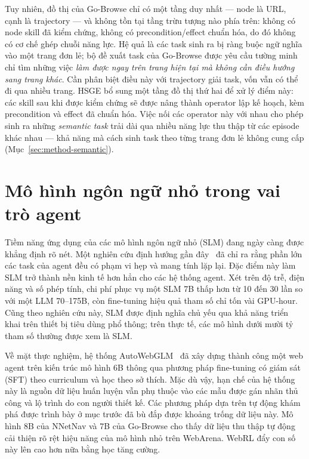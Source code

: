Tuy nhiên, đồ thị của Go-Browse chỉ có một tầng duy nhất --- node là URL, cạnh là
trajectory --- và không tồn tại tầng trừu tượng nào phía trên: không có node skill đã
kiểm chứng, không có precondition/effect chuẩn hóa, do đó không có cơ chế ghép chuỗi
năng lực. Hệ quả là các task sinh ra bị ràng buộc ngữ nghĩa vào một trang đơn lẻ;
bộ đề xuất task của Go-Browse được yêu cầu tường minh chỉ tìm những
việc \emph{làm được ngay trên trang hiện tại mà không cần điều hướng sang trang
khác}. Cần phân biệt điều này với trajectory giải task, vốn vẫn có thể đi qua nhiều
trang. HSGE bổ sung một tầng đồ thị thứ hai để xử lý điểm này: các skill sau khi được kiểm chứng sẽ được nâng thành operator
lập kế hoạch, kèm precondition và effect
đã chuẩn hóa. Việc nối các operator này với nhau cho phép sinh ra những \emph{semantic
task} trải dài qua nhiều năng lực thu thập từ các episode khác
nhau --- khả năng mà cách sinh task theo từng trang đơn lẻ không cung cấp
(Mục~\ref{sec:method-semantic}).

\section{Mô hình ngôn ngữ nhỏ trong vai trò agent}
\label{sec:rel-slm}

Tiềm năng ứng dụng của các mô hình ngôn ngữ nhỏ (SLM) đang ngày càng được khẳng định rõ nét. Một nghiên cứu định hướng gần đây~\cite{belcak2025slm} đã chỉ ra rằng phần lớn các task của agent đều có phạm vi hẹp và mang tính lặp lại. Đặc điểm này làm SLM trở thành nền kinh tế hơn hẳn cho các hệ thống agent. Xét trên độ trễ, điện năng và số phép tính, chi phí phục vụ một SLM 7B thấp hơn từ 10 đến 30 lần so với một LLM 70--175B, còn fine-tuning hiệu quả tham số chỉ tốn vài GPU-hour. Cũng theo nghiên cứu này, SLM được định nghĩa chủ yếu qua khả năng triển khai trên thiết bị tiêu dùng phổ thông; trên thực tế, các mô hình dưới mười tỷ tham số thường được xem là SLM.

Về mặt thực nghiệm, hệ thống AutoWebGLM~\cite{lai2024autowebglm} đã xây dựng thành công một web agent trên kiến trúc mô hình 6B thông qua phương pháp fine-tuning có giám sát (SFT) theo curriculum và học theo sở thích. Mặc dù vậy, hạn chế của hệ thống này là nguồn dữ liệu huấn luyện vẫn phụ thuộc vào các mẫu được gán nhãn thủ công và lộ trình do con người thiết kế. Các phương pháp dựa trên tự động khám phá được trình bày ở mục trước đã bù đắp được khoảng trống dữ liệu này. Mô hình 8B của NNetNav và 7B của Go-Browse cho thấy dữ liệu thu thập tự động cải thiện rõ rệt hiệu năng của mô hình nhỏ trên WebArena. WebRL đẩy con số này lên cao hơn nữa bằng học tăng cường.

